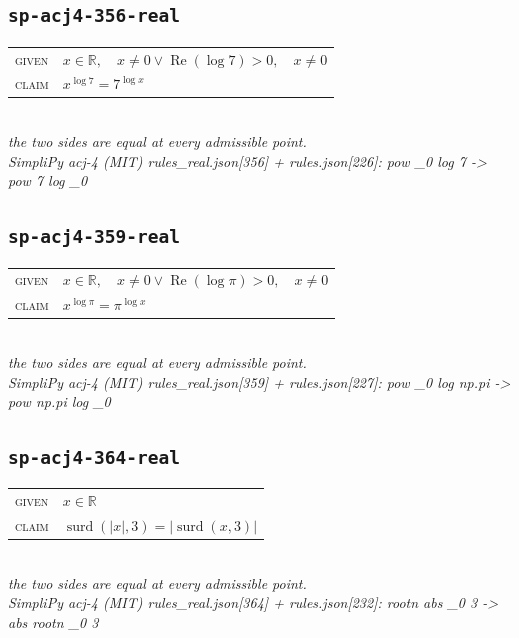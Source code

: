 \documentclass[11pt]{article}
\begin{document}
\subsection*{\texttt{sp-acj4-356-real}}
\begin{tabular}{@{}l@{\quad}l@{}}
\textsc{given} & $x \in \mathbb{R},\quad x \neq 0 \lor \operatorname{Re}\left(\log 7\right) > 0,\quad x \neq 0$ \\[4pt]
\textsc{claim} & $\displaystyle x^{\log 7} = 7^{\log x}$ \\
\end{tabular}\\[2pt]
{\small\emph{the two sides are equal at every admissible point.}}\\
\emph{SimpliPy acj-4 (MIT) rules\_real.json[356] + rules.json[226]: pow \_0 log 7  ->  pow 7 log \_0}\\

\subsection*{\texttt{sp-acj4-359-real}}
\begin{tabular}{@{}l@{\quad}l@{}}
\textsc{given} & $x \in \mathbb{R},\quad x \neq 0 \lor \operatorname{Re}\left(\log \pi\right) > 0,\quad x \neq 0$ \\[4pt]
\textsc{claim} & $\displaystyle x^{\log \pi} = \pi^{\log x}$ \\
\end{tabular}\\[2pt]
{\small\emph{the two sides are equal at every admissible point.}}\\
\emph{SimpliPy acj-4 (MIT) rules\_real.json[359] + rules.json[227]: pow \_0 log np.pi  ->  pow np.pi log \_0}\\

\subsection*{\texttt{sp-acj4-364-real}}
\begin{tabular}{@{}l@{\quad}l@{}}
\textsc{given} & $x \in \mathbb{R}$ \\[4pt]
\textsc{claim} & $\displaystyle \operatorname{surd}\left(\left|x\right|, 3\right) = \left|\operatorname{surd}\left(x, 3\right)\right|$ \\
\end{tabular}\\[2pt]
{\small\emph{the two sides are equal at every admissible point.}}\\
\emph{SimpliPy acj-4 (MIT) rules\_real.json[364] + rules.json[232]: rootn abs \_0 3  ->  abs rootn \_0 3}\\
\end{document}
